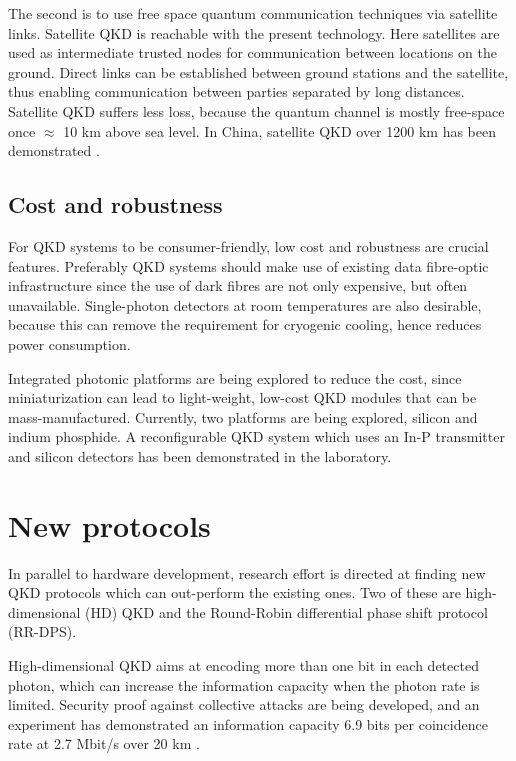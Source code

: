 \documentclass[reprint,
superscriptaddress,
 amsmath,amssymb,
 aps,
prb,
]{revtex4-1}
\begin{document}
The second is to use free space quantum communication techniques via satellite links. Satellite QKD is reachable with the present technology. Here satellites are used as intermediate trusted nodes for
communication between locations on the ground.
 Direct links can be
established between ground stations and the satellite, thus
enabling communication between parties separated by long distances. Satellite QKD suffers less loss, because the quantum channel is mostly free-space once $\approx$ 10 km above sea level.
% 
In China, satellite QKD over 1200 km has been demonstrated \cite{liao2017satellite}.


\subsection{Cost and robustness}
For QKD systems to be consumer-friendly, low cost and robustness are crucial features. Preferably QKD systems should make use of existing data fibre-optic infrastructure since the use of dark fibres are not only expensive, but often unavailable\cite{diamanti2016practical}. Single-photon detectors at room temperatures are also desirable, 
because this can remove the requirement for cryogenic cooling, hence reduces power consumption.

Integrated photonic platforms are being explored to reduce the cost, since miniaturization can lead to light-weight, low-cost QKD modules that can be mass-manufactured. 
Currently, two platforms are being explored, silicon\cite{lim2014review} and indium phosphide\cite{smit2014introduction}.
A reconfigurable QKD system which uses an In-P transmitter and silicon detectors has been demonstrated in the laboratory\cite{sibson2017chip}.




\section{New protocols}
In parallel to hardware development, research effort is directed at finding new QKD protocols which can out-perform the existing ones. Two of these are high-dimensional (HD) QKD and the Round-Robin differential phase shift protocol (RR-DPS).

High-dimensional QKD aims at encoding more than one bit in each detected photon, which can increase the information capacity when the photon rate is limited.
Security proof against collective attacks are being developed, and an experiment has demonstrated an information capacity
 6.9 bits per coincidence rate at 2.7 Mbit/s over 20 km \cite{zhong2015photon}.
\end{document}
